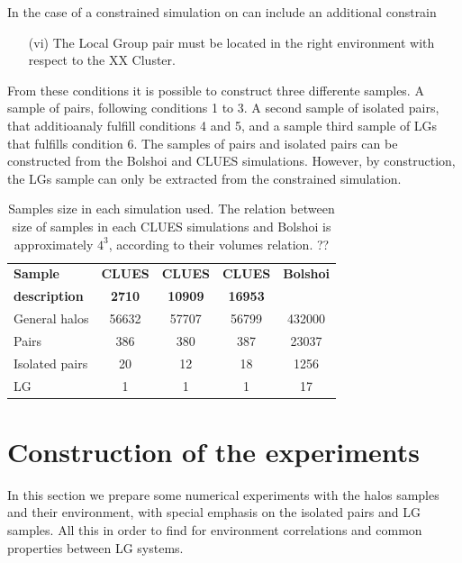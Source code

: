 \documentclass[usenatbib]{mn2e}
\begin{document}
In the case of a constrained simulation on can include an additional constrain
\begin{enumerate}
\item[(vi)]{The Local Group pair must be located in the right environment with respect to the XX Cluster.}
\end{enumerate}

From these conditions it is possible to construct three differente samples. A sample of pairs, following
conditions 1 to 3. A second sample of isolated pairs, that additioanaly fulfill conditions 4 and 5, and
a sample third sample of LGs that fulfills condition 6. The samples of pairs and isolated pairs can be 
constructed from the Bolshoi and CLUES simulations. However, by construction, the LGs sample can only be 
extracted from the constrained simulation.

\begin{table}
  \centering
  \begin{tabular}{l | c c c c} \hline
	\textbf{Sample}& \textbf{CLUES} & \textbf{CLUES} & \textbf{CLUES} & \textbf{Bolshoi} \\
	\textbf{description}& \textbf{2710} & \textbf{10909} & \textbf{16953} &  \\ \hline
	General halos & 56632 & 57707 & 56799 & 432000 \\
	Pairs & 386 & 380 & 387 & 23037 \\
	Isolated pairs & 20 & 12 & 18 & 1256 \\
	LG & 1 & 1 & 1 & 17\\ \hline
  \end{tabular}
  \caption{Samples size in each simulation used. The relation between size of samples in each CLUES simulations and
  Bolshoi is approximately $4^3$, according to their volumes relation. ?? }
  \label{Tab:Samples}
\end{table}



\section{Construction of the experiments}
\label{sec:experiments}

In this section we prepare some numerical experiments with the halos samples and their environment, 
with special emphasis on the isolated pairs and LG samples. All this in order to find for environment 
correlations and common properties between LG systems.
\end{document}
